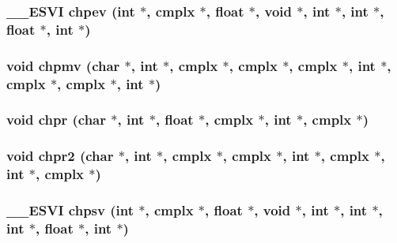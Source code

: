 \subsubsection{\setlength{\rightskip}{0pt plus 5cm}\_\-\_\-ESVI chpev (int $\ast$, {\bf cmplx} $\ast$, float $\ast$, void $\ast$, int $\ast$, int $\ast$, float $\ast$, int $\ast$)}\label{essl_8h_cc9ac627d99d947120ce3a084d8b53d4}


\subsubsection{\setlength{\rightskip}{0pt plus 5cm}void chpmv (char $\ast$, int $\ast$, {\bf cmplx} $\ast$, {\bf cmplx} $\ast$, {\bf cmplx} $\ast$, int $\ast$, {\bf cmplx} $\ast$, {\bf cmplx} $\ast$, int $\ast$)}\label{essl_8h_6200af358ff0c60ab63451a9b37ec5f8}


\subsubsection{\setlength{\rightskip}{0pt plus 5cm}void chpr (char $\ast$, int $\ast$, float $\ast$, {\bf cmplx} $\ast$, int $\ast$, {\bf cmplx} $\ast$)}\label{essl_8h_c622d8464853d340bb0d5ded17140380}


\subsubsection{\setlength{\rightskip}{0pt plus 5cm}void chpr2 (char $\ast$, int $\ast$, {\bf cmplx} $\ast$, {\bf cmplx} $\ast$, int $\ast$, {\bf cmplx} $\ast$, int $\ast$, {\bf cmplx} $\ast$)}\label{essl_8h_228cfe5075d7bf98e58b4cfd649df6ab}


\subsubsection{\setlength{\rightskip}{0pt plus 5cm}\_\-\_\-ESVI chpsv (int $\ast$, {\bf cmplx} $\ast$, float $\ast$, void $\ast$, int $\ast$, int $\ast$, int $\ast$, float $\ast$, int $\ast$)}\label{essl_8h_f8e1e882ab2ecfc8f62ed8704ad084b4}



